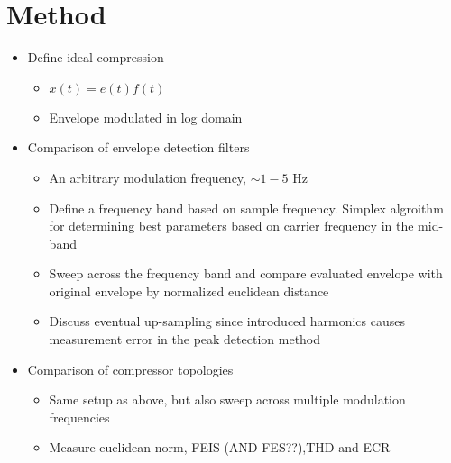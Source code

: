 \documentclass[../main2.tex]{subfiles}
\providecommand{\rootdir}{..}
\begin{document}
\section{Method}
\begin{itemize}
\item{Define ideal compression}
\begin{itemize}
	\item{$x(t) = e(t)f(t)$}
	\item{Envelope modulated in log domain}
\end{itemize}
\item{Comparison of envelope detection filters}
\begin{itemize}
	\item{An arbitrary modulation frequency, $\sim 1-5$ Hz}	
	\item{Define a frequency band based on sample frequency. Simplex algroithm for determining best parameters based on carrier frequency in the mid-band}
	\item{Sweep across the frequency band and compare evaluated envelope with original envelope by normalized euclidean distance}
	\item{Discuss eventual up-sampling since introduced harmonics causes measurement error in the peak detection method}
\end{itemize}
\item{Comparison of compressor topologies}
\begin{itemize}
	\item{Same setup as above, but also sweep across multiple modulation frequencies}
	\item{Measure euclidean norm, FEIS (AND FES??),THD and ECR}
\end{itemize}
\end{itemize}




\end{document}
